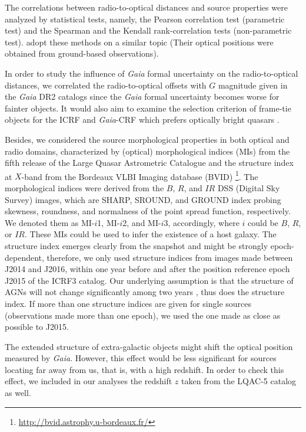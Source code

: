 \documentclass[referee]{aa}        %
\begin{document}
   The correlations between radio-to-optical distances and source properties were analyzed by statistical tests, namely, the Pearson correlation test (parametric test) and the Spearman and the Kendall rank-correlation tests (non-parametric test).
   \citet{2013MNRAS.430.2797A} adopt these methods on a similar topic (Their optical positions were obtained from ground-based observations).

   In order to study the influence of \textit{Gaia} formal uncertainty on the radio-to-optical distances, we correlated the radio-to-optical offsets with $G$ magnitude given in the {\it Gaia} DR2 catalogs since the \textit{Gaia} formal uncertainty becomes worse for fainter objects.
   It would also aim to examine the selection criterion of frame-tie objects for the ICRF and \textit{Gaia}-CRF which prefers optically bright quasars \citep[visual magnitude $V<18$, see, e.g.,][]{2008A&A...490..403B}.

   Besides, we considered the source morphological properties in both optical and radio domains, characterized by (optical) morphological indices (MIs) from the fifth release of the Large Quasar Astrometric Catalogue \citep[LQAC-5;][]{2019A&A...624A.145S} and the structure index \citep[SI;][]{1997ApJS..111...95F} at $X$-band from the Bordeaux VLBI Imaging database (BVID) \footnote{\url{http://bvid.astrophy.u-bordeaux.fr/}}.
   The morphological indices were derived from the $B$, $R$, and $IR$ DSS (Digital Sky Survey) images, which are SHARP, SROUND, and GROUND index probing skewness, roundness, and normalness of the point spread function, respectively.
   We denoted them as MI-$i$1, MI-$i$2, and MI-$i$3, accordingly, where $i$ could be $B$, $R$, or $IR$.
   These MIs could be used to infer the existence of a host galaxy.
   The structure index emerges clearly from the snapshot and might be strongly epoch-dependent, therefore, we only used structure indices from images made between J2014 and J2016, within one year before and after the position reference epoch J2015 of the ICRF3 catalog.
   Our underlying assumption is that the structure of AGNs will not change significantly among two years \citep[e.g., see][]{2016A&A...589A..71B}, thus does the structure index.
   If more than one structure indices are given for single sources (observations made more than one epoch), we used the one made as close as possible to J2015.

   The extended structure of extra-galactic objects might shift the optical position measured by \textit{Gaia}.
   However, this effect would be less significant for sources locating far away from us, that is, with a high redshift.
   In order to check this effect, we included in our analyses the redshift $z$ taken from the LQAC-5 catalog as well.
\end{document}

